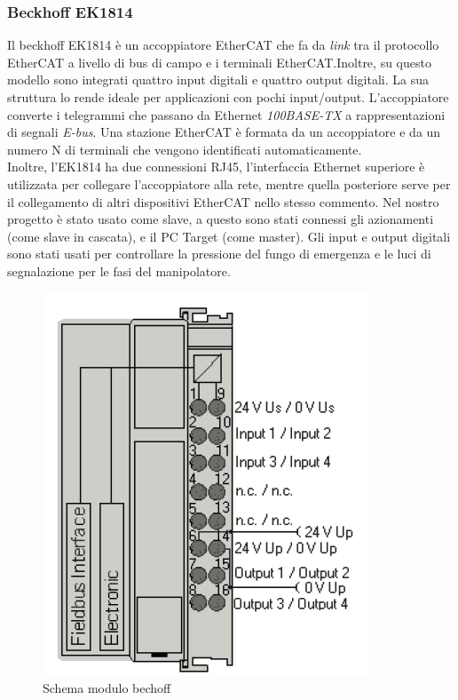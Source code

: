 \subsubsection{Beckhoff EK1814}
Il beckhoff EK1814 è un accoppiatore EtherCAT che fa da \textit{link} tra il protocollo EtherCAT a livello di bus di campo e i terminali EtherCAT.Inoltre, su questo modello sono integrati quattro input digitali e quattro output digitali. La sua struttura lo rende ideale per applicazioni con pochi input/output. L'accoppiatore converte i telegrammi che passano da Ethernet \textit{100BASE-TX} a rappresentazioni di segnali \textit{E-bus}. Una stazione EtherCAT è formata da un accoppiatore e da un numero N di terminali che vengono identificati automaticamente.
\\Inoltre, l'EK1814 ha due connessioni RJ45, l'interfaccia Ethernet superiore è utilizzata per collegare l'accoppiatore alla rete, mentre quella posteriore serve per il collegamento di altri dispositivi EtherCAT nello stesso commento. Nel nostro progetto è stato usato come slave, a questo sono stati connessi gli azionamenti (come slave in cascata), e il PC Target (come master). Gli input e output digitali sono stati usati per controllare la pressione del fungo di emergenza e le luci di segnalazione per le fasi del manipolatore.
\begin{figure}[ht]
	\begin{center}
		\includegraphics[scale=0.6]{Immagini/Sperimentale/Beckoffschema.PNG}
		\caption{Schema modulo bechoff}
		\label{fig:ModuloBechoff}
	\end{center}
\end{figure}
